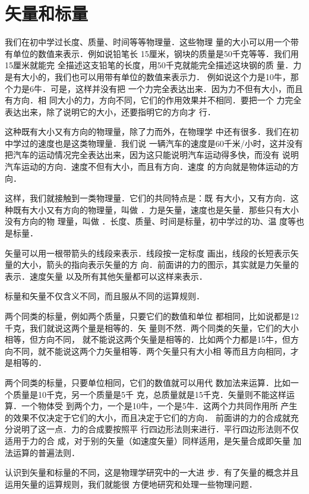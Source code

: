 \section{矢量和标量} 
    我们在初中学过长度、质量、时间等等物理量．这些物理
量的大小可以用一个带有单位的数值来表示．例如说铅笔长
15厘米，钢块的质量是50千克等等．我们用15厘米就能完
全描述这支铅笔的长度，用50千克就能完全描述这块钢的质
量．力是有大小的，我们也可以用带有单位的数值来表示力．
例如说这个力是10牛，那个力是6牛．可是，这样并没有把
一个力完全表达出来．因为力不但有大小，而且有方向．相
同大小的力，方向不同，它们的作用效果并不相同．要把一个
力完全表达出来，除了说明它的大小，还要指明它的方向才
行．

    这种既有大小又有方向的物理量，除了力而外，在物理学
中还有很多．我们在初中学过的速度也是这类物理量．我们说
一辆汽车的速度是60千米/小时，这并没有把汽车的运动情况完全表达出来，因为这只能说明汽车运动得多快，而没有
说明汽车运动的方向．速度不但有大小，而且有方向．速度
的方向就是物体运动的方向．

    这样，我们就接触到一类物理量．它们的共同特点是：既
有大小，又有方向．这种既有大小又有方向的物理量，叫做 ．力是矢量，速度也是矢量．那些只有大小没有方向的物
理量，叫做 ．长度、质量、时间是标量，初中学过的功、温
度等也是标量．

    矢量可以用一根带箭头的线段来表示．线段按一定标度
画出，线段的长短表示矢量的大小，箭头的指向表示矢量的方
向．前面讲的力的图示，其实就是力矢量的表示．速度矢量
以及所有其他矢量都可以这样来表示．

    标量和矢量不仅含义不同，而且服从不同的运算规则．

    两个同类的标量，例如两个质量，只要它们的数值和单位
都相同，比如说都是12千克，我们就说这两个量是相等的．矢
量则不然．两个同类的矢量，它们的大小相等，但方向不同，
就不能说这两个矢量是相等的．比如两个力都是15牛，但方
向不同，就不能说这两个力矢量相等．两个矢量只有大小相
等而且方向相同，才是相等的．

    两个同类的标量，只要单位相同，它们的数值就可以用代
数加法来运算．比如一个质量是10千克，另一个质量是5千
克，总质量就是15千克．矢量则不能这样运算．一个物体受
到两个力，一个是10牛，一个是5牛．这两个力共同作用所
产生的效果不仅决定于它们的大小，而且决定于它们的方向．
前面讲的力的合成就充分说明了这一点．力的合成要按照平
行四边形法则来进行．平行四边形法则不仅适用于力的合
成，对于别的矢量（如速度矢量）同样适用，是矢量合成即矢量
加法运算的普遍法则．

    认识到矢量和标量的不同，这是物理学研究中的一大进
步．有了矢量的概念并且运用矢量的运算规则，我们就能很
方便地研究和处理一些物理问题．

